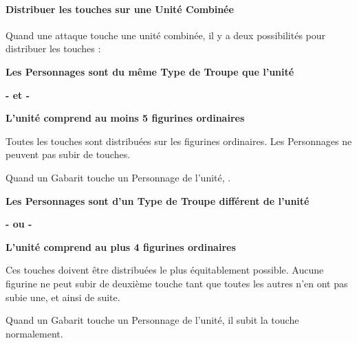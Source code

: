 \newpage
\paragraph{Distribuer les touches sur une Unité Combinée}
\label{distributing_hits_at_combined_units}

Quand une attaque touche une unité combinée, il y a deux possibilités pour distribuer les touches :

\setlength\columnseprule{0.5pt}
\begin{multicols}{2}\raggedcolumns

\noindent
\begin{center}\textbf{Les Personnages sont du même Type de Troupe que l'unité}\end{center}
\begin{center}\textbf{- et -}\end{center}
\begin{center}\textbf{L'unité comprend au moins 5 figurines ordinaires}\end{center}

\noindent Toutes les touches sont distribuées sur les figurines ordinaires. Les Personnages ne peuvent pas subir de touches.

\noindent Quand un Gabarit touche un Personnage de l'unité, .

\columnbreak

\noindent
\begin{center}\textbf{Les Personnages sont d'un Type de Troupe différent de l'unité}\end{center}
\begin{center}\textbf{- ou -}\end{center}
\begin{center}\textbf{L'unité comprend au plus 4 figurines ordinaires}\end{center}

\noindent {} Ces touches doivent être distribuées le plus équitablement possible. Aucune figurine ne peut subir de deuxième touche tant que toutes les autres n'en ont pas subie une, et ainsi de suite.

\noindent Quand un Gabarit touche un Personnage de l'unité, il subit la touche normalement.

\end{multicols}
\setlength\columnseprule{0pt}


